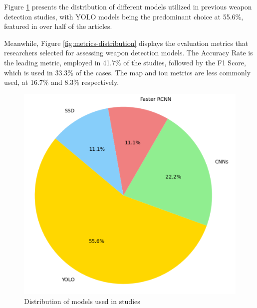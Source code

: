 Figure \ref{fig:models-distribution} presents the distribution of different models utilized in previous weapon detection studies, with YOLO models being the predominant choice at 55.6\%, featured in over half of the articles. 

Meanwhile, Figure \ref{fig:metrics-distribution} displays the evaluation metrics that researchers selected for assessing weapon detection models. The Accuracy Rate is the leading metric, employed in 41.7\% of the studies, followed by the F1 Score, which is used in 33.3\% of the cases. The \ac{map} and \ac{iou} metrics are less commonly used, at 16.7\% and 8.3\% respectively.
\begin{figure}[h]
    \centering

    \begin{minipage}{0.4\textwidth}
        \centering
        \includegraphics[width=\textwidth]{figs/models-distribution.png} %
        \caption{Distribution of models used in studies}
        \label{fig:models-distribution}
    \end{minipage}
    \hfill
    \begin{minipage}{0.5\textwidth}
        \centering

\end{minipage}
\end{figure}

